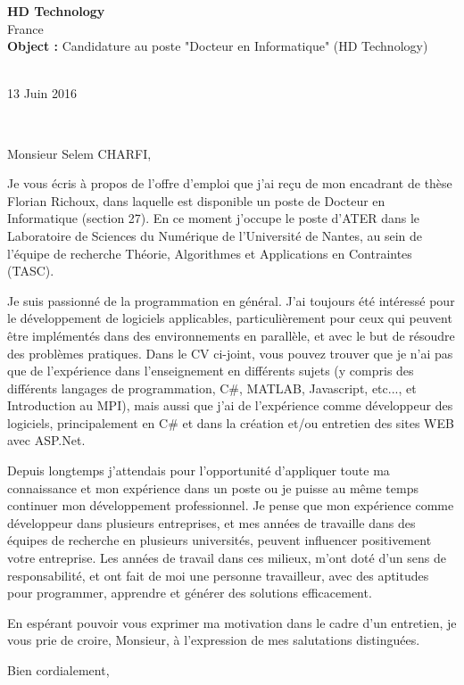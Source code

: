 \documentclass[11pt,a4paper]{letter} %
\def\opening#1{\thispagestyle{empty}
{\centering\fromaddress \vspace{0.6in} \\ %
\hspace{6cm}13 Juin 2016\hspace*{\fill}\par} %
{\raggedright \toname \\ \toaddress \par} %
\vspace{0.4in} %
\noindent #1 %
}
\begin{document}

\begin{letter}
{{\bf HD Technology}\\France\\
\vspace{0.2in}
\textbf{Object :} Candidature au poste "Docteur en Informatique" (HD Technology)
}


\opening{Monsieur Selem CHARFI,}

Je vous écris à propos de l'offre d'emploi que j'ai reçu de mon encadrant de thèse Florian {\sc Richoux}, dans laquelle est disponible un poste de Docteur en Informatique (section 27). En ce moment j'occupe le poste d'ATER dans le Laboratoire de Sciences du Numérique de l'Université de Nantes, au sein de l'équipe de recherche Théorie, Algorithmes et Applications en Contraintes (TASC). %

Je suis passionné de la programmation en général. J'ai toujours été intéressé pour le développement de logiciels applicables, particulièrement pour ceux qui peuvent être implémentés dans des environnements en parallèle, et avec le but de résoudre des problèmes pratiques. Dans le CV ci-joint, vous pouvez trouver que je n'ai pas que de l'expérience dans l'enseignement en différents sujets (y compris des différents langages de programmation, C\#, MATLAB, Javascript, etc..., et Introduction au MPI), mais aussi que j'ai de l'expérience comme développeur des logiciels, principalement en C\# et dans la création et/ou entretien des sites WEB avec ASP.Net. 

Depuis longtemps j'attendais pour l'opportunité d'appliquer toute ma connaissance et mon expérience dans un poste ou je puisse au même temps continuer mon développement professionnel. Je pense que mon expérience comme développeur dans plusieurs entreprises, et mes années de travaille dans des équipes de recherche en plusieurs universités, peuvent influencer positivement votre entreprise. Les années de travail dans ces milieux, m'ont doté d'un sens de responsabilité, et ont fait de moi une personne travailleur, avec des aptitudes pour programmer, apprendre et générer des solutions efficacement. 


En espérant pouvoir vous exprimer ma motivation dans le cadre d'un entretien, je vous prie de croire, Monsieur, à l'expression de mes salutations distinguées.

\closing{Bien cordialement,}


\end{letter}
\end{document}
